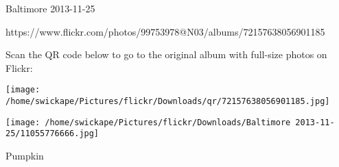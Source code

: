 \documentclass[10pt,letterpaper]{article}
\begin{document}
Baltimore 2013-11-25

https://www.flickr.com/photos/99753978@N03/albums/72157638056901185

Scan the QR code below to go to the original album with full-size photos on Flickr:

\texttt{[image: /home/swickape/Pictures/flickr/Downloads/qr/72157638056901185.jpg]}
\pagebreak

\texttt{[image: /home/swickape/Pictures/flickr/Downloads/Baltimore 2013-11-25/11055776666.jpg]}

Pumpkin\\
\pagebreak
\end{document}
